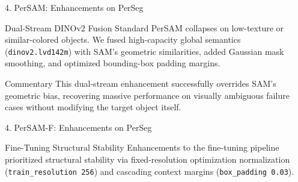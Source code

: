 \documentclass[aspectratio=169, 10pt]{beamer}
\begin{document}
\begin{frame}{4. PerSAM: Enhancements on PerSeg}
    \begin{block}{Dual-Stream DINOv2 Fusion}
        Standard PerSAM collapses on low-texture or similar-colored objects. We fused high-capacity global semantics (\texttt{dinov2.lvd142m}) with SAM's geometric similarities, added Gaussian mask smoothing, and optimized bounding-box padding margins.
    \end{block}

    \begin{table}[htbp]
    \centering
    \caption{Enhanced PerSAM vs Reproduced Baseline on PerSeg}
    \end{table}

    \begin{alertblock}{Commentary}
        \footnotesize This dual-stream enhancement successfully overrides SAM's geometric bias, recovering massive performance on visually ambiguous failure cases without modifying the target object itself.
    \end{alertblock}
\end{frame}

\begin{frame}{4. PerSAM-F: Enhancements on PerSeg}
    \begin{block}{Fine-Tuning Structural Stability}
        Enhancements to the fine-tuning pipeline prioritized structural stability via fixed-resolution optimization normalization (\texttt{train\_resolution 256}) and cascading context margins (\texttt{box\_padding 0.03}).
    \end{block}

    \begin{table}[htbp]
    \centering
    \caption{Enhanced PerSAM-F vs Reproduced Baseline on PerSeg}
    \end{table}
\end{frame}
\end{document}
